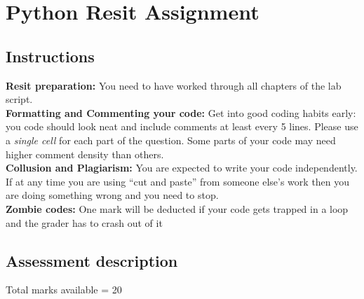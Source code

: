 \chapter{Python Resit Assignment}
\label{resit}

\section{Instructions}

{\bf Resit preparation:}  You need to have worked through all chapters of the lab script.\\

{\bf Formatting and Commenting your code:} Get into good coding habits early: you code should look neat and include comments at least every 5 lines. Please use a {\it single cell} for each part of the question. Some parts of your code may need higher comment density than others.\\

{\bf Collusion and Plagiarism:} You are expected to write your code independently. If at any time you are using ``cut and paste'' from someone else's work then you are doing something wrong and you need to stop.\\

{\bf Zombie codes:} One mark will be deducted if your code gets trapped in a loop and the grader has to crash out of it \\

\section{Assessment description}

Total marks available = 20


